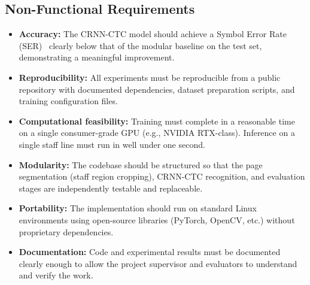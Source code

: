 \documentclass[11pt, a4paper]{article}
\begin{document}
\subsection{Non-Functional Requirements}
\begin{itemize}
    \item \textbf{Accuracy:} The CRNN-CTC model should achieve a Symbol Error Rate (SER)~\cite{SymbolErrorRate} clearly below that of the modular baseline on the test set, demonstrating a meaningful improvement.
    \item \textbf{Reproducibility:} All experiments must be reproducible from a public repository with documented dependencies, dataset preparation scripts, and training configuration files.
    \item \textbf{Computational feasibility:} Training must complete in a reasonable time on a single consumer-grade GPU (e.g., NVIDIA RTX-class). Inference on a single staff line must run in well under one second.
    \item \textbf{Modularity:} The codebase should be structured so that the page segmentation (staff region cropping), CRNN-CTC recognition, and evaluation stages are independently testable and replaceable.
    \item \textbf{Portability:} The implementation should run on standard Linux environments using open-source libraries (PyTorch, OpenCV, etc.) without proprietary dependencies.
    \item \textbf{Documentation:} Code and experimental results must be documented clearly enough to allow the project supervisor and evaluators to understand and verify the work.
\end{itemize}
\end{document}
